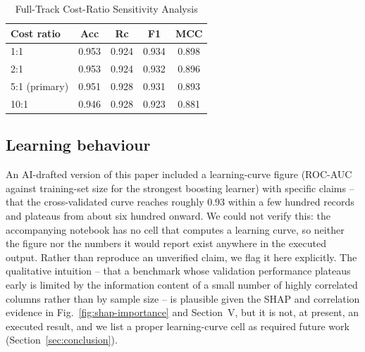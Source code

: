 \documentclass[conference]{IEEEtran}
\begin{document}
\begin{table}[!t]
\caption{Full-Track Cost-Ratio Sensitivity Analysis}
\label{tab:sensitivity}
\centering
\begin{tabular}{@{}lcccc@{}}
\toprule
\textbf{Cost ratio} & \textbf{Acc} & \textbf{Rc} & \textbf{F1} & \textbf{MCC} \\
\midrule
1:1 & 0.953 & 0.924 & 0.934 & 0.898 \\
2:1 & 0.953 & 0.924 & 0.932 & 0.896 \\
5:1 (primary) & 0.951 & 0.928 & 0.931 & 0.893 \\
10:1 & 0.946 & 0.928 & 0.923 & 0.881 \\
\bottomrule
\end{tabular}
\end{table}

\subsection{Learning behaviour}
\label{sec:learning}
An AI-drafted version of this paper included a learning-curve figure (ROC-AUC against training-set size for the strongest boosting learner) with specific claims -- that the cross-validated curve reaches roughly 0.93 within a few hundred records and plateaus from about six hundred onward. We could not verify this: the accompanying notebook has no cell that computes a learning curve, so neither the figure nor the numbers it would report exist anywhere in the executed output. Rather than reproduce an unverified claim, we flag it here explicitly. The qualitative intuition -- that a benchmark whose validation performance plateaus early is limited by the information content of a small number of highly correlated columns rather than by sample size -- is plausible given the SHAP and correlation evidence in Fig.~\ref{fig:shap-importance} and Section~V, but it is not, at present, an executed result, and we list a proper learning-curve cell as required future work (Section~\ref{sec:conclusion}).
\end{document}
